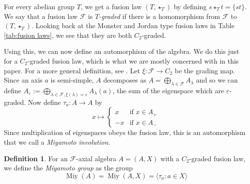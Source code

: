 \documentclass[11pt, a4paper]{article}
\theoremstyle{plain}
\theoremstyle{definition}
\newtheorem{definition}[theorem]{Definition}
\newcommand\lm{\lambda}
\newcommand\cF{\mathcal{F}}
\newcommand\la{\langle}
\newcommand\ra{\rangle}
\newcommand\id{\mathrm{id}}
\newcommand\FF{\mathbb{F}}
\DeclareMathOperator{\Miy}{Miy}
\newcommand{\0}{\overline{0}}
\newcommand{\2}{\overline{2}}
\renewcommand{\epsilon}{\varepsilon}
\newcommand{\1}{\mathbbm{1}}
\newcommand{\ie}{i.e.\ }
\begin{document}
For every abelian group $T$, we get a fusion law $(T, \star_T)$ by defining $s \star_T t = \{ st\}$.  We say that a fusion law $\cF$ is \emph{$T$-graded} if there is a homomorphism from $\cF$ to $(T, \star_T)$.  Looking back at the Monster and Jordan type fusion laws in Table \ref{tab:fusion laws}, we see that they are both $C_2$-graded.

Using this, we can now define an automorphism of the algebra.  We do this just for a $C_2$-graded fusion law, which is what we are mostly concerned with in this paper.  For a more general definition, see \cite{axialstructure}.  Let $\xi \colon \cF \to C_2$ be the grading map.  Since an axis $a$ is semi-simple, $A$ decomposes as $A = \bigoplus_{\lm \in \cF} A_\lm$ and so we can define $A_\epsilon :=  \bigoplus_{\lm \in \cF, \xi(\lm) = \epsilon} A_\lm(a)$, the sum of the eigenspace which are $\epsilon$-graded.  Now define $\tau_a\colon A \to A$ by
\[
x \mapsto \begin{cases}
x & \text{if } x \in A_+ \\
-x & \text{if } x \in A_- 
\end{cases}
\]
Since multiplication of eigenspaces obeys the fusion law, this is an automorphism that we call a \emph{Miyamoto involution}.

%

\begin{definition}
For an $\cF$-axial algebra $A = (A, X)$ with a $C_2$-graded fusion law, we define the \emph{Miyamoto group} as the group
\[
\Miy(A) = \Miy(A, X) = \la \tau_a : a \in X \ra
\]
\end{definition}
\end{document}
